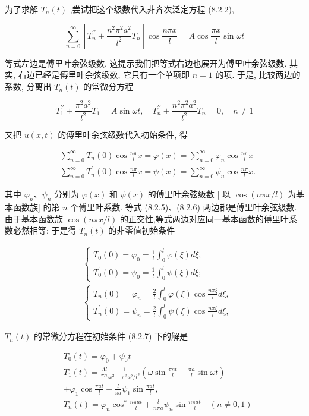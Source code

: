为了求解 $T_{n}(t)$ ,尝试把这个级数代入非齐次泛定方程 (8.2.2),

$$
\sum_{n=0}^{\infty}\left[T_{n}^{\prime \prime}+\frac{n^{2} \pi^{2} a^{2}}{l^{2}} T_{n}\right] \cos \frac{n \pi x}{l}=A \cos \frac{\pi x}{l} \sin \omega t
$$

等式左边是傅里叶余弦级数, 这提示我们把等式右边也展开为傅里叶余弦级数. 其实, 右边已经是傅里叶余弦级数, 它只有一个单项即 $n=1$ 的项. 于是, 比较两边的系数, 分离出 $T_{n}(t)$ 的常微分方程

$$
T_{1}^{\prime \prime}+\frac{\pi^{2} a^{2}}{l^{2}} T_{1}=A \sin \omega t, \quad T_{n}^{\prime \prime}+\frac{n^{2} \pi^{2} a^{2}}{l^{2}} T_{n}=0, \quad n \neq 1
$$

又把 $u(x, t)$ 的傅里叶余弦级数代入初始条件, 得

$$
\begin{aligned}
& \sum_{n=0}^{\infty} T_{n}(0) \cos \frac{n \pi}{l} x=\varphi(x)=\sum_{n=0}^{\infty} \varphi_{n} \cos \frac{n \pi}{l} x \\
& \sum_{n=0}^{\infty} T_{n}^{\prime}(0) \cos \frac{n \pi}{l} x=\psi(x)=\sum_{n=0}^{\infty} \psi_{n} \cos \frac{n \pi}{l} x .
\end{aligned}
$$

其中 $\varphi_{n} 、 \psi_{n}$ 分别为 $\varphi(x)$ 和 $\psi(x)$ 的傅里叶余弦级数 [ 以 $\cos (n \pi x / l)$ 为基本函数族] 的第 $n$ 个傅里叶系数. 等式 (8.2.5)、(8.2.6) 两边都是傅里叶余弦级数. 由于基本函数族 $\cos (n \pi x / l)$ 的正交性,等式两边对应同一基本函数的傅里叶系数必然相等; 于是得 $T_{n}(t)$ 的非零值初始条件

$$
\begin{aligned}
& \left\{\begin{array}{l}
T_{0}(0)=\varphi_{0}=\frac{1}{l} \int_{0}^{l} \varphi(\xi) d \xi, \\
T_{0}^{\prime}(0)=\psi_{0}=\frac{1}{l} \int_{0}^{l} \psi(\xi) d \xi ;
\end{array}\right. \\
& \left\{\begin{array}{l}
T_{n}(0)=\varphi_{n}=\frac{2}{l} \int_{0}^{l} \varphi(\xi) \cos \frac{n \pi \xi}{l} d \xi, \\
T_{n}^{\prime}(0)=\psi_{n}=\frac{2}{l} \int_{0}^{l} \psi(\xi) \cos \frac{n \pi \xi}{l} d \xi,
\end{array}\right.
\end{aligned}
$$

$T_{n}(t)$ 的常微分方程在初始条件 (8.2.7) 下的解是

$$
\begin{aligned}
& T_{0}(t)=\varphi_{0}+\psi_{0} t \\
& T_{1}(t)=\frac{A l}{\pi a} \frac{1}{\omega^{2}-\pi^{2} a^{2} / l^{2}}\left(\omega \sin \frac{\pi a t}{l}-\frac{\pi a}{l} \sin \omega t\right) \\
&+\varphi_{1} \cos \frac{\pi a t}{l}+\frac{l}{\pi a} \psi_{1} \sin \frac{\pi a t}{l}, \\
& T_{n}(t)=\varphi_{n} \cos ^{*} \frac{n \pi a t}{l}+\frac{l}{n \pi a} \psi_{n} \sin \frac{n \pi a t}{l} \quad(n \neq 0,1)
\end{aligned}
$$

